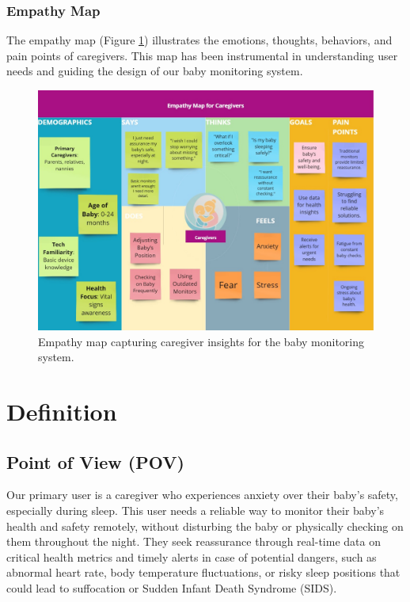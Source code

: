 \documentclass[12pt,a4paper]{report}
\begin{document}
\subsection{Empathy Map}
The empathy map (Figure \ref{fig:empathy}) illustrates the emotions, thoughts, behaviors, and pain points of caregivers. This map has been instrumental in understanding user needs and guiding the design of our baby monitoring system.

\begin{figure}[H]
  \centering
  \includegraphics[scale=0.3]{./pic/empathy.jpg}
  \caption{Empathy map capturing caregiver insights for the baby monitoring system.}
  \label{fig:empathy}
\end{figure}


\chapter{Definition}
\section{Point of View (POV)}
Our primary user is a caregiver who experiences anxiety over their baby's safety, especially during sleep. This user needs a reliable way to monitor their baby’s health and safety remotely, without disturbing the baby or physically checking on them throughout the night. They seek reassurance through real-time data on critical health metrics and timely alerts in case of potential dangers, such as abnormal heart rate, body temperature fluctuations, or risky sleep positions that could lead to suffocation or Sudden Infant Death Syndrome (SIDS).
\end{document}
